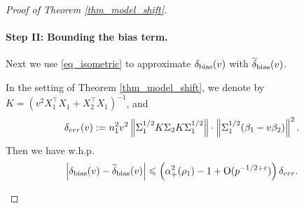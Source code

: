 \begin{proof}[Proof of Theorem \ref{thm_model_shift}]
\paragraph{Step II: Bounding the bias term.}
Next we use \eqref{eq_isometric} to approximate $\delta_{\text{bias}}(v)$ with $\widetilde\delta_{\text{bias}}(v)$. %
\begin{claim}\label{prop_model_shift}
	In the setting of Theorem \ref{thm_model_shift},
	we denote by $K = (v^2X_1^{\top}X_1 + X_2^{\top}X_1)^{-1}$, and
	\begin{align*}
		\delta_{err}(v) := n_1^2 v^2 \left\| \Sigma_1^{1/2} K \Sigma_2 K \Sigma_1^{1/2} \right\| \cdot \left\| \Sigma_1^{1/2} (\beta_1 - v\beta_2) \right\|^2.
	\end{align*}
	Then we have w.h.p.
	\begin{align*}
		 \left| \delta_{\text{bias}}(v)-\widetilde\delta_{\text{bias}}(v)\right| 
		\leqslant  \left( \alpha_+^2(\rho_1)-1 + \operatorname{O}(p^{-1/2+{\varepsilon}})\right)\delta_{err}.
	\end{align*}
\end{claim}


\end{proof}
